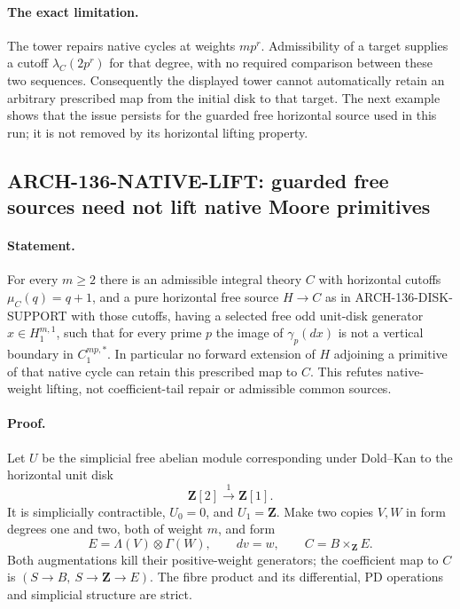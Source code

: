 \paragraph{The exact limitation.}
The tower repairs native cycles at weights $mp^r$.  Admissibility
of a target supplies a cutoff $\lambda_C(2p^r)$ for that degree,
with no required comparison between these two sequences.
Consequently the displayed tower cannot automatically retain an
arbitrary prescribed map from the initial disk to that target.
The next example shows that the issue persists for the guarded
free horizontal source used in this run; it is not removed by its
horizontal lifting property.

\subsection{ARCH-136-NATIVE-LIFT: guarded free sources need not lift native Moore primitives}

\paragraph{Statement.}
For every $m\geq2$ there is an admissible integral theory $C$ with
horizontal cutoffs $\mu_C(q)=q+1$, and a pure horizontal free source
$H\to C$ as in ARCH-136-DISK-SUPPORT with those cutoffs, having a
selected free odd unit-disk generator $x\in H_1^{m,1}$, such that
for every prime $p$ the image of
$\gamma_p(dx)$ is not a vertical boundary in $C_1^{mp,*}$.
In particular no forward extension of $H$ adjoining a primitive
of that native cycle can retain this prescribed map to $C$.
This refutes native-weight lifting, not coefficient-tail repair
or admissible common sources.

\paragraph{Proof.}
Let $U$ be the simplicial free abelian module corresponding under
Dold--Kan to the horizontal unit disk
\[
                \mathbf Z[2]\xrightarrow{1}\mathbf Z[1].
\]
It is simplicially contractible, $U_0=0$, and $U_1=\mathbf Z$.
Make two copies $V,W$ in form degrees one and two, both of weight
$m$, and form
\[
 E=\Lambda(V)\otimes\Gamma(W),\qquad dv=w,
 \qquad C=B\mathbin{\times}_{\mathbf Z}E.                 \tag{136.NL1}
\]
Both augmentations kill their positive-weight generators; the
coefficient map to $C$ is $(S\to B,\ S\to\mathbf Z\to E)$.
The fibre product and its differential, PD operations and
simplicial structure are strict.

